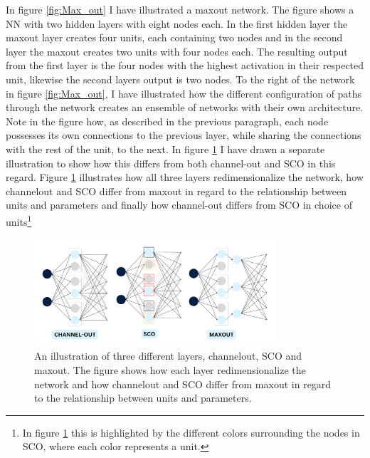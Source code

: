 In figure \ref{fig:Max_out} I have illustrated a maxout network. The figure shows a \ac{NN} with two hidden layers
with eight nodes each. In the first hidden layer the maxout layer creates four units, each containing two nodes and in the 
second layer the maxout creates two units with four nodes each. The resulting output from the first layer is the 
four nodes with the highest activation in their respected unit, likewise the second layers output is two nodes.
To the right of the network in figure \ref{fig:Max_out}, I have illustrated how the different configuration of 
paths through the network creates an ensemble of networks with their own architecture. Note in the figure how, as described in the 
previous paragraph, each node possesses its own connections to the previous layer, while sharing the connections with the 
rest of the unit, to the next. In figure \ref{fig:NetEnsembleComp} I have drawn a separate illustration to show how 
this differs from both channel-out and \ac{SCO} in this regard. Figure \ref{fig:NetEnsembleComp} illustrates how 
all three layers redimensionalize the network, how channelout and \ac{SCO} differ from maxout in regard to the relationship 
between units and parameters and finally how channel-out differs from \ac{SCO} in choice of units\footnote{In figure 
\ref{fig:NetEnsembleComp} this is highlighted by the different colors surrounding the nodes in \ac{SCO}, where each color 
represents a unit.}
\begin{figure}
    \centering
    \includegraphics[width=0.8\textwidth]{Figures/Illustrations/EnsembleComp.png}
    \caption[An illustration of three different layers, channelout, \ac{SCO} and maxout.]{An illustration of three different layers, channelout, \ac{SCO} and maxout. The figure shows how each layer 
    redimensionalize the network and how channelout and \ac{SCO} differ from maxout in regard to the relationship 
    between units and parameters.}
    \label{fig:NetEnsembleComp}
\end{figure}
